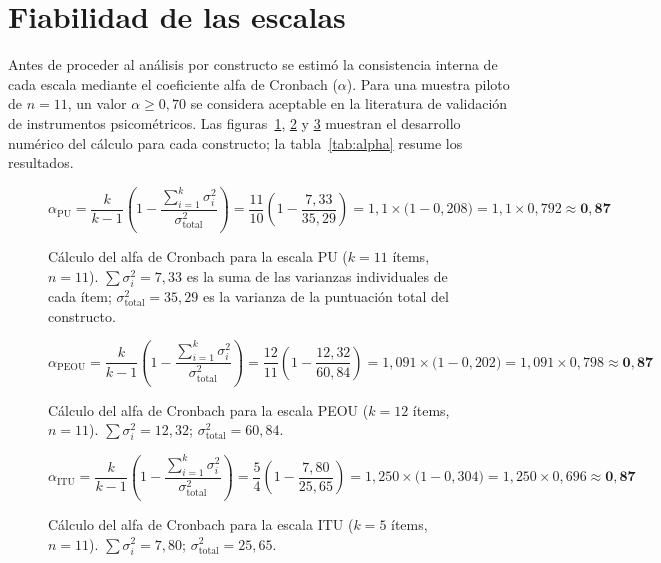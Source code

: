 \section{Fiabilidad de las escalas}\label{sec:fiabilidad}

Antes de proceder al análisis por constructo se estimó la consistencia interna de cada escala mediante el coeficiente alfa de Cronbach ($\alpha$). Para una muestra piloto de $n = 11$, un valor $\alpha \geq 0{,}70$ se considera aceptable en la literatura de validación de instrumentos psicométricos. Las figuras~\ref{fig:alpha-pu}, \ref{fig:alpha-peou} y \ref{fig:alpha-itu} muestran el desarrollo numérico del cálculo para cada constructo; la tabla~\ref{tab:alpha} resume los resultados.

\begin{figure}[h!]
\centering
\[
  \alpha_{\mathrm{PU}}
  = \frac{k}{k-1}\!\left(1 - \frac{\displaystyle\sum_{i=1}^{k}\sigma_i^2}{\sigma_{\mathrm{total}}^2}\right)
  = \frac{11}{10}\!\left(1 - \frac{7{,}33}{35{,}29}\right)
  = 1{,}1 \times \bigl(1 - 0{,}208\bigr)
  = 1{,}1 \times 0{,}792
  \approx \mathbf{0{,}87}
\]
\caption{Cálculo del alfa de Cronbach para la escala PU ($k = 11$ ítems, $n = 11$).
  $\sum\sigma_i^2 = 7{,}33$ es la suma de las varianzas individuales de cada ítem;
  $\sigma_{\mathrm{total}}^2 = 35{,}29$ es la varianza de la puntuación total del constructo.}
\label{fig:alpha-pu}
\end{figure}

\begin{figure}[h!]
\centering
\[
  \alpha_{\mathrm{PEOU}}
  = \frac{k}{k-1}\!\left(1 - \frac{\displaystyle\sum_{i=1}^{k}\sigma_i^2}{\sigma_{\mathrm{total}}^2}\right)
  = \frac{12}{11}\!\left(1 - \frac{12{,}32}{60{,}84}\right)
  = 1{,}091 \times \bigl(1 - 0{,}202\bigr)
  = 1{,}091 \times 0{,}798
  \approx \mathbf{0{,}87}
\]
\caption{Cálculo del alfa de Cronbach para la escala PEOU ($k = 12$ ítems, $n = 11$).
  $\sum\sigma_i^2 = 12{,}32$;
  $\sigma_{\mathrm{total}}^2 = 60{,}84$.}
\label{fig:alpha-peou}
\end{figure}

\begin{figure}[h!]
\centering
\[
  \alpha_{\mathrm{ITU}}
  = \frac{k}{k-1}\!\left(1 - \frac{\displaystyle\sum_{i=1}^{k}\sigma_i^2}{\sigma_{\mathrm{total}}^2}\right)
  = \frac{5}{4}\!\left(1 - \frac{7{,}80}{25{,}65}\right)
  = 1{,}250 \times \bigl(1 - 0{,}304\bigr)
  = 1{,}250 \times 0{,}696
  \approx \mathbf{0{,}87}
\]
\caption{Cálculo del alfa de Cronbach para la escala ITU ($k = 5$ ítems, $n = 11$).
  $\sum\sigma_i^2 = 7{,}80$;
  $\sigma_{\mathrm{total}}^2 = 25{,}65$.}
\label{fig:alpha-itu}
\end{figure}

